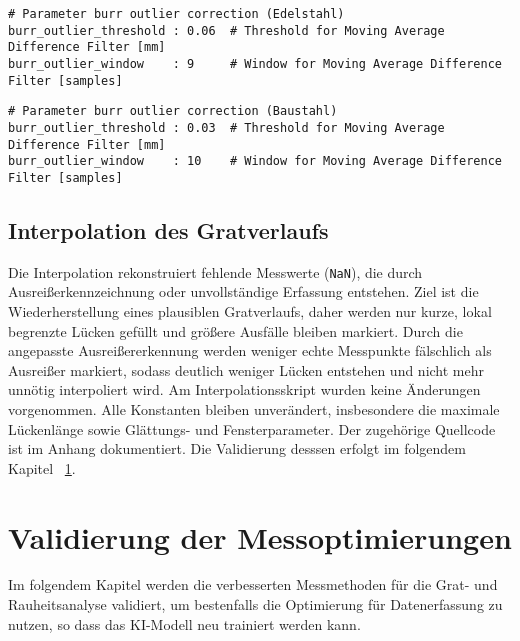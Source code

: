 \begin{lstlisting}[caption={Pipeline-Parameter Outlier Correction (Edelstahl, Burr-Kanal)}, label={lst:params-outlier-stainless}]
# Parameter burr outlier correction (Edelstahl)
burr_outlier_threshold : 0.06  # Threshold for Moving Average Difference Filter [mm]
burr_outlier_window    : 9     # Window for Moving Average Difference Filter [samples]
\end{lstlisting}

\begin{lstlisting}[caption={Pipeline-Parameter Outlier Correction (Baustahl, Burr-Kanal)}, label={lst:params-outlier-mild}]
# Parameter burr outlier correction (Baustahl)
burr_outlier_threshold : 0.03  # Threshold for Moving Average Difference Filter [mm]
burr_outlier_window    : 10    # Window for Moving Average Difference Filter [samples]
\end{lstlisting}

\subsection{Interpolation des Gratverlaufs}
\label{sec:Interpolation}

Die Interpolation rekonstruiert fehlende Messwerte (\texttt{NaN}), die durch Ausreißerkennzeichnung oder unvollständige Erfassung entstehen. Ziel ist die Wiederherstellung eines plausiblen Gratverlaufs, daher werden nur kurze, lokal begrenzte Lücken gefüllt und größere Ausfälle bleiben markiert. Durch die angepasste Ausreißererkennung werden weniger echte Messpunkte fälschlich als Ausreißer markiert, sodass deutlich weniger Lücken entstehen und nicht mehr unnötig interpoliert wird. Am Interpolationsskript wurden keine Änderungen vorgenommen. Alle Konstanten bleiben unverändert, insbesondere die maximale Lückenlänge sowie Glättungs- und Fensterparameter. Der zugehörige Quellcode ist im Anhang dokumentiert.
Die Validierung desssen erfolgt im folgendem Kapitel ~\ref{sec:validierung-burr}.

\section {Validierung der Messoptimierungen}
\label{sec:validierung-burr}

Im folgendem Kapitel werden die verbesserten Messmethoden für die Grat- und Rauheitsanalyse validiert, um bestenfalls die Optimierung für Datenerfassung zu nutzen, so dass das KI-Modell neu trainiert werden kann. 

